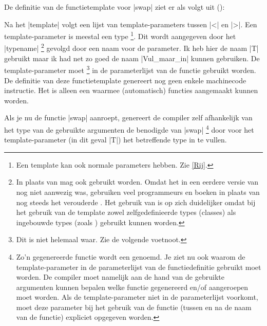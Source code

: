 \begin{cpplstShortInline}
\label{code:swap_template}
De definitie van de functietemplate voor |swap| ziet er als volgt uit ():

Na het  |template| volgt een lijst van template\hyp{}parameters tussen |<| en |>|.
Een template\hyp{}parameter is meestal een type%
\footnote{%
    Een template kan ook normale parameters hebben.
    Zie \cref{Rij}.
}.
Dit wordt aangegeven door het  |typename|%
\footnote{%
    In plaats van  mag ook  gebruikt worden.
    Omdat het   in een eerdere versie van \Cpp{} nog niet aanwezig was, gebruiken veel \Cpp{} programmeurs en \Cpp{} boeken in plaats van  nog steeds het verouderde .
    Het gebruik van  is op zich duidelijker omdat bij het gebruik van de template zowel zelfgedefinieerde types (classes) als ingebouwde types (zoals ) gebruikt kunnen worden.
} gevolgd door een naam voor de parameter.
Ik heb hier de naam |T| gebruikt maar ik had net zo goed de naam |Vul_maar_in| kunnen gebruiken.
De template\hyp{}parameter moet%
\footnote{%
    Dit is niet helemaal waar. 
    Zie de volgende voetnoot.
} in de parameterlijst van de functie gebruikt worden.
De definitie van deze functietemplate genereert nog geen enkele machinecode instructie. 
Het is alleen een  waarmee (automatisch) functies aangemaakt kunnen worden.

Als je nu de functie |swap| aanroept, genereert de compiler zelf afhankelijk van het type van de gebruikte argumenten de benodigde  van |swap|%
\footnote{%
    Zo'n gegenereerde functie wordt een \emph{} genoemd.
    Je ziet nu ook waarom de template\hyp{}parameter in de parameterlijst van de functiedefinitie gebruikt moet worden.
    De compiler moet namelijk aan de hand van de gebruikte argumenten kunnen bepalen welke functie gegenereerd en/of aangeroepen moet worden.
    Als de template\hyp{}parameter niet in de parameterlijst voorkomt, moet deze parameter bij het gebruik van de functie (tussen \cppcode{<} en \cppcode{>} na de naam van de functie) expliciet opgegeven worden.
} door voor het template\hyp{}parameter (in dit geval |T|) het betreffende type in te vullen.


\end{cpplstShortInline}
